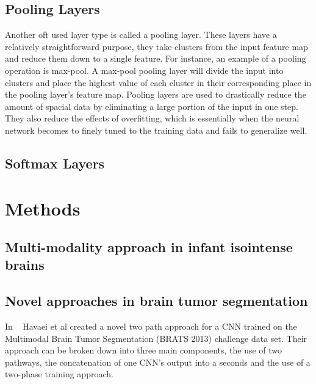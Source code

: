 \documentclass{sig-alternate}
\begin{document}
\subsection{Pooling Layers}
\label{sec:poolingLayers}

Another oft used layer type is called a pooling layer. These layers have a relatively straightforward purpose, they take clusters from the input feature map and reduce them down to a single feature. For instance, an example of a pooling operation is max-pool. A max-pool pooling layer will divide the input into clusters and place the highest value of each cluster in their corresponding place in the pooling layer's feature map. Pooling layers are used to drastically reduce the amount of spacial data by eliminating a large portion of the input in one step. They also reduce the effects of overfitting, which is essentially when the neural network becomes to finely tuned to the training data and fails to generalize well.


\subsection{Softmax Layers}
\label{sec:softmaxLayers}



\section{Methods}
\label{sec:methods}


\subsection{Multi-modality approach in infant isointense brains}
\label{sec:multiModality}

\subsection{Novel approaches in brain tumor segmentation}
\label{sec:novelBrainTumorApproach}
In ~\cite{Havaei:2017} Havaei et al created a novel two path approach for a CNN trained on the Multimodal Brain Tumor Segmentation (BRATS 2013) challenge data set. Their approach can be broken down into three main components, the use of two pathways, the concatenation of one CNN's output into a seconds and the use of a two-phase training approach.
\end{document}
